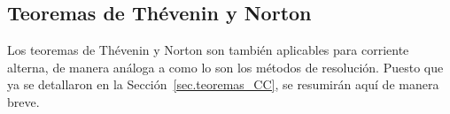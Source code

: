 \documentclass[11pt]{book} %
\begin{document}
\begin{example}
	\end{example}
	
	\subsection{Teoremas de Thévenin y Norton}
    Los teoremas de Thévenin y Norton son también aplicables para corriente alterna, de manera análoga a como lo son los métodos de resolución. Puesto que ya se detallaron en la Sección~\ref{sec.teoremas_CC}, se resumirán aquí de manera breve. 
\end{document}
